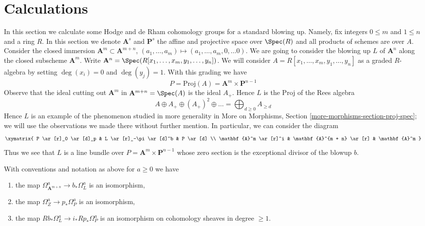 \section{Calculations}
\label{section-calculations}

\noindent
In this section we calculate some Hodge and de Rham cohomology
groups for a standard blowing up. Namely, fix integers
$0 \leq m$ and $1 \leq n$ and a ring $R$. In this section we denote
$\mathbf{A}^s$ and $\mathbf{P}^s$ the affine and projective
space over $\Spec(R)$ and all products of schemes are over $A$.
Consider the closed immersion $\mathbf{A}^m \subset \mathbf{A}^{m + n}$,
$(a_1, \ldots, a_m) \mapsto (a_1, \ldots, a_m, 0, \ldots 0)$.
We are going to consider the blowing up $L$ of $\mathbf{A}^n$
along the closed subscheme $\mathbf{A}^m$. Write
$\mathbf{A}^n = \Spec(R[x_1, \ldots, x_m, y_1, \ldots, y_n])$.
We will consider $A = R[x_1, \ldots, x_m, y_1, \ldots, y_n]$ as a
graded $R$-algebra by setting $\deg(x_i) = 0$ and $\deg(y_j) = 1$.
With this grading we have
$$
P = \text{Proj}(A) = \mathbf{A}^m \times \mathbf{P}^{n - 1}
$$
Observe that the ideal cutting out $\mathbf{A}^m$ in
$\mathbf{A}^{m + n} = \Spec(A)$ is the ideal $A_+$.
Hence $L$ is the Proj of the Rees algebra
$$
A \oplus A_+ \oplus (A_+)^2 \oplus \ldots =
\bigoplus\nolimits_{d \geq 0} A_{\geq d}
$$
Hence $L$ is an example of the phenomenon studied in
more generality in More on Morphisms, Section
\ref{more-morphisms-section-proj-spec};
we will use the observations we made there without further mention.
In particular, we can consider the diagram
$$
\xymatrix{
P \ar[r]_0 \ar[d]_p &
L \ar[r]_-\pi \ar[d]^b &
P \ar[d] \\
\mathbf{A}^m \ar[r]^i &
\mathbf{A}^{m + n} \ar[r] &
\mathbf{A}^m
}
$$
Thus we see that $L$ is a line bundle over
$P = \mathbf{A}^m \times \mathbf{P}^{n - 1}$
whose zero section is the exceptional divisor of the blowup $b$.

\begin{lemma}
\label{lemma-comparison}
With conventions and notation as above for $a \geq 0$ we have
\begin{enumerate}
\item the map
$\Omega^a_{\mathbf{A}^{m + n}} \to b_*\Omega^a_L$ is an isomorphism,
\item the map $\Omega^a_Z \to p_*\Omega^a_P$ is an isomorphism,
\item the map $Rb_*\Omega^a_L \to i_*Rp_*\Omega^a_P$ is an isomorphism
on cohomology sheaves in degree $\geq 1$.
\end{enumerate}
\end{lemma}


